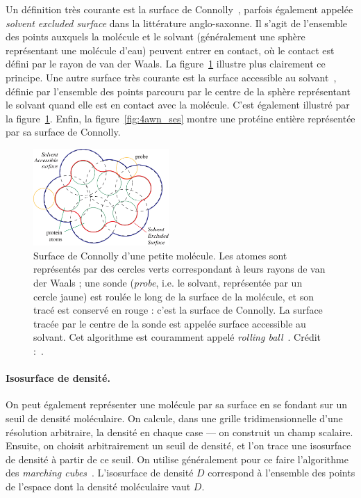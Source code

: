 	Un définition très courante est la surface de Connolly~\cite{connolly1983analytical}, parfois également appelée \emph{solvent excluded surface} dans la littérature anglo-saxonne. Il s'agit de l'ensemble des points auxquels la molécule et \og le solvant \fg{} (généralement une sphère représentant une molécule d'eau) peuvent entrer en contact, où le contact est défini par le rayon de van der Waals. La figure~\ref{fig:connolly} illustre plus clairement ce principe. Une autre surface très courante est la surface accessible au solvant~\cite{lee1971interpretation}, définie par l'ensemble des points parcouru par le centre de la sphère représentant le solvant quand elle est en contact avec la molécule. C'est également illustré par la figure~\ref{fig:connolly}. Enfin, la figure~\ref{fig:4awn_ses} montre une protéine entière représentée par sa surface de Connolly.

	\begin{figure}
		\centering
		\includegraphics[width=0.46\textwidth]{figures/ch1/connolly}
		\caption[Surface de Connolly et accessible au solvant]{Surface de Connolly d'une petite molécule. Les atomes sont représentés par des cercles verts correspondant à leurs rayons de van der Waals ; une sonde (\emph{probe}, i.e. le solvant, représentée par un cercle jaune) est \og roulée \fg{} le long de la surface de la molécule, et son tracé est conservé en rouge : c'est la surface de Connolly. La surface tracée par le centre de la sonde est appelée surface accessible au solvant. Cet algorithme est couramment appelé \emph{rolling ball}~\cite{shrake1973environment, connolly1983analytical, connolly1993molecular}. Crédit :~\cite{krone2009interactive}.}
		\label{fig:connolly}
	\end{figure}
		
	\paragraph{Isosurface de densité.} On peut également représenter une molécule par sa surface en se fondant sur un seuil de densité moléculaire. On calcule, dans une grille tridimensionnelle d'une résolution arbitraire, la densité en chaque case --- on construit un champ scalaire. Ensuite, on choisit arbitrairement un seuil de densité, et l'on trace une isosurface de densité à partir de ce seuil. On utilise généralement pour ce faire l'algorithme des \emph{marching cubes}~\cite{lorensen1987marching}.%
	L'isosurface de densité $D$ correspond à l'ensemble des points de l'espace dont la densité moléculaire vaut $D$.
		

